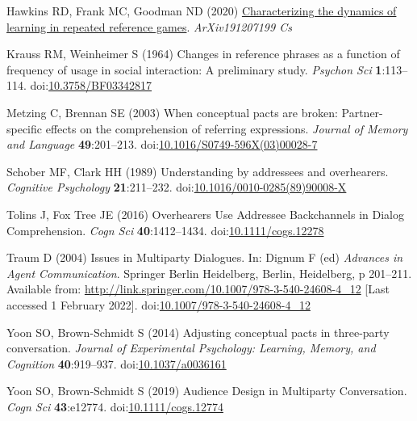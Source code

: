 \documentclass[
  english,
  a4paper,
]{article}
\newlength{\cslhangindent}
\newlength{\cslentryspacingunit} %
\newenvironment{CSLReferences}[2] %
 {%
  \setlength{\parindent}{0pt}
  \ifodd #1
  \let\oldpar\par
  \def\par{\hangindent=\cslhangindent\oldpar}
  \fi
  \setlength{\parskip}{#2\cslentryspacingunit}
 }%
 {}
\begin{document}
\begin{CSLReferences}{1}{0}
\leavevmode{}%
Hawkins RD, Frank MC, Goodman ND (2020) \href{http://arxiv.org/abs/1912.07199}{Characterizing the dynamics of learning in repeated reference games}. \emph{ArXiv191207199 Cs}

\leavevmode{}%
Krauss RM, Weinheimer S (1964) Changes in reference phrases as a function of frequency of usage in social interaction: A preliminary study. \emph{Psychon Sci} \textbf{1}:113--114. doi:\href{https://doi.org/10.3758/BF03342817}{10.3758/BF03342817}

\leavevmode{}%
Metzing C, Brennan SE (2003) When conceptual pacts are broken: {Partner-specific} effects on the comprehension of referring expressions. \emph{Journal of Memory and Language} \textbf{49}:201--213. doi:\href{https://doi.org/10.1016/S0749-596X(03)00028-7}{10.1016/S0749-596X(03)00028-7}

\leavevmode{}%
Schober MF, Clark HH (1989) Understanding by addressees and overhearers. \emph{Cognitive Psychology} \textbf{21}:211--232. doi:\href{https://doi.org/10.1016/0010-0285(89)90008-X}{10.1016/0010-0285(89)90008-X}

\leavevmode{}%
Tolins J, Fox Tree JE (2016) Overhearers {Use Addressee Backchannels} in {Dialog Comprehension}. \emph{Cogn Sci} \textbf{40}:1412--1434. doi:\href{https://doi.org/10.1111/cogs.12278}{10.1111/cogs.12278}

\leavevmode{}%
Traum D (2004) Issues in {Multiparty Dialogues}. In: Dignum F (ed) \emph{Advances in {Agent Communication}}. {Springer Berlin Heidelberg}, {Berlin, Heidelberg}, p 201--211. Available from: \url{http://link.springer.com/10.1007/978-3-540-24608-4_12} {[}Last accessed 1 February 2022{]}. doi:\href{https://doi.org/10.1007/978-3-540-24608-4_12}{10.1007/978-3-540-24608-4\_12}

\leavevmode{}%
Yoon SO, Brown-Schmidt S (2014) Adjusting conceptual pacts in three-party conversation. \emph{Journal of Experimental Psychology: Learning, Memory, and Cognition} \textbf{40}:919--937. doi:\href{https://doi.org/10.1037/a0036161}{10.1037/a0036161}

\leavevmode{}%
Yoon SO, Brown‐Schmidt S (2019) Audience {Design} in {Multiparty Conversation}. \emph{Cogn Sci} \textbf{43}:e12774. doi:\href{https://doi.org/10.1111/cogs.12774}{10.1111/cogs.12774}

\end{CSLReferences}
\end{document}
